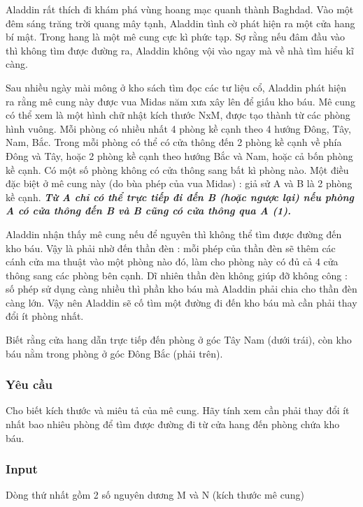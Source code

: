 

Aladdin rất thích đi khám phá vùng hoang mạc quanh thành Baghdad. Vào một đêm sáng trăng trời quang mây tạnh, Aladdin tình cờ phát hiện ra một cửa hang bí mật. Trong hang là một mê cung cực kì phức tạp. Sợ rằng nếu đâm đầu vào thì không tìm được đường ra, Aladdin không vội vào ngay mà về nhà tìm hiểu kĩ càng.

Sau nhiều ngày mài mông ở kho sách tìm đọc các tư liệu cổ, Aladdin phát hiện ra rằng mê cung này được vua Midas năm xưa xây lên để giấu kho báu. Mê cung có thể xem là một hình chữ nhật kích thước NxM, được tạo thành từ các phòng hình vuông. Mỗi phòng có nhiều nhất 4 phòng kề cạnh theo 4 hướng Đông, Tây, Nam, Bắc. Trong mỗi phòng có thể có cửa thông đến 2 phòng kề cạnh về phía Đông và Tây, hoặc 2 phòng kề cạnh theo hướng Bắc và Nam, hoặc cả bốn phòng kề cạnh. Có một số phòng không có cửa thông sang bất kì phòng nào. Một điều đặc biệt ở mê cung này (do bùa phép của vua Midas) : giả sử A và B là 2 phòng kề cạnh. \textbf{\emph{ Từ A chỉ có thể trực tiếp đi đến B (hoặc ngược lại) nếu phòng A có cửa thông đến B và B cũng có cửa thông qua A (1). }}

Aladdin nhận thấy mê cung nếu để nguyên thì không thể tìm được đường đến kho báu. Vậy là phải nhờ đến thần đèn : mỗi phép của thần đèn sẽ thêm các cánh cửa ma thuật vào một phòng nào đó, làm cho phòng này có đủ cả 4 cửa thông sang các phòng bên cạnh. Dĩ nhiên thần đèn không giúp đỡ không công : số phép sử dụng càng nhiều thì phần kho báu mà Aladdin phải chia cho thần đèn càng lớn. Vậy nên Aladdin sẽ cố tìm một đường đi đến kho báu mà cần phải thay đổi ít phòng nhất.

Biết rằng cửa hang dẫn trực tiếp đến phòng ở góc Tây Nam (dưới trái), còn kho báu nằm trong phòng ở góc Đông Bắc (phải trên).

\subsubsection{Yêu cầu}

Cho biết kích thước và miêu tả của mê cung. Hãy tính xem cần phải thay đổi ít nhất bao nhiêu phòng để tìm được đường đi từ cửa hang đến phòng chứa kho báu.

\subsubsection{Input}

Dòng thứ nhất gồm 2 số nguyên dương M và N (kích thước mê cung)

